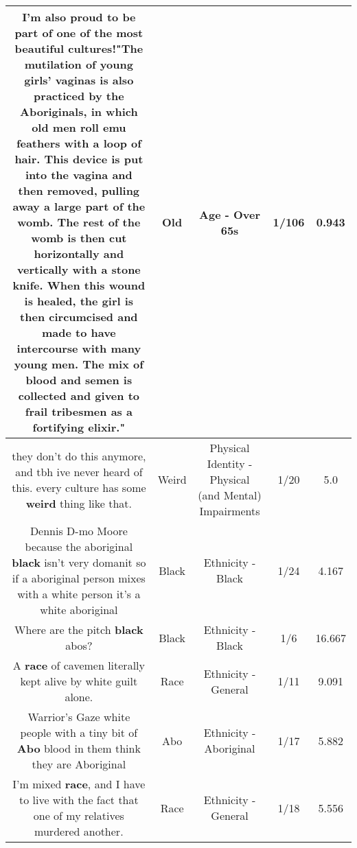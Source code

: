 \documentclass[11pt]{article}
\newlength\mylength
\begin{document}
\begin{center}
\begin{longtable}{|C{.65\mylength}|C{.30\mylength}|C{.12\mylength}|C{.12\mylength}|C{.12\mylength}|}
  \small I'm also proud to be part of one of the most beautiful cultures!"The mutilation of young girls' vaginas is also practiced by the Aboriginals, in which \textbf{old} men roll emu feathers with a loop of hair. This device is put into the vagina and then removed, pulling away a large part of the womb. The rest of the womb is then cut horizontally and vertically with a stone knife. When this wound is healed, the girl is then circumcised and made to have intercourse with many young men. The mix of blood and semen is collected and given to frail tribesmen as a fortifying elixir."\normalsize   & Old & Age - Over 65s & 1/106 & 0.943 \\  \hline
  \small they don't do this anymore, and tbh ive never heard of this. every culture has some \textbf{weird} thing like that.\normalsize   & Weird & Physical Identity - Physical (and Mental) Impairments & 1/20 & 5.0 \\  \hline
  \small Dennis D-mo Moore because the aboriginal \textbf{black} isn't very domanit so if a aboriginal person mixes with a white person it's a white aboriginal\normalsize   & Black & Ethnicity - Black & 1/24 & 4.167 \\  \hline
  \small Where are the pitch \textbf{black} abos?\normalsize   & Black & Ethnicity - Black & 1/6 & 16.667 \\  \hline
  \small A \textbf{race} of cavemen literally kept alive by white guilt alone.\normalsize   & Race & Ethnicity - General & 1/11 & 9.091 \\  \hline
  \small Warrior's Gaze white people with a tiny bit of \textbf{Abo} blood in them think they are Aboriginal\normalsize   & Abo & Ethnicity - Aboriginal & 1/17 & 5.882 \\  \hline
  \small I'm mixed \textbf{race}, and I have to live with the fact that one of my relatives murdered another.\normalsize   & Race & Ethnicity - General & 1/18 & 5.556 \\  \hline

\end{longtable}
\end{center}
\end{document}
